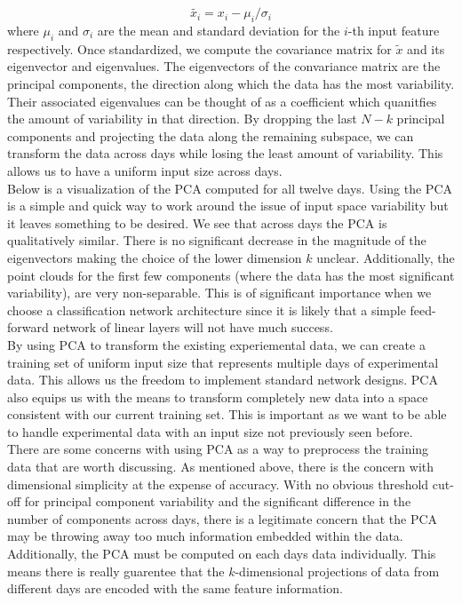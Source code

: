 \documentclass[12pt]{article}
\begin{document}
$$ \tilde{x_i} = x_i - \mu_i / \sigma_i $$
where $\mu_i$ and $\sigma_i$ are the mean and standard deviation for the $i$-th input feature respectively. Once standardized, we compute the covariance matrix for $\tilde{x}$ and its eigenvector and eigenvalues. The eigenvectors of the convariance matrix are the principal components, the direction along which the data has the most variability. Their associated eigenvalues can be thought of as a coefficient which quanitfies the amount of variability in that direction. By dropping the last $N-k$ principal components and projecting the data along the remaining subspace, we can transform the data across days while losing the least amount of variability. This allows us to have a uniform input size across days. \\
Below is a visualization of the PCA computed for all twelve days. Using the PCA is a simple and quick way to work around the issue of input space variability but it leaves something to be desired. We see that across days the PCA is qualitatively similar. There is no significant decrease in the magnitude of the eigenvectors making the choice of the lower dimension $k$ unclear. Additionally, the point clouds for the first few components (where the data has the most significant variability), are very non-separable. This is of significant importance when we choose a classification network architecture since it is likely that a simple feed-forward network of linear layers will not have much success. \\
By using PCA to transform the existing experiemental data, we can create a training set of uniform input size that represents multiple days of experimental data. This allows us the freedom to implement standard network designs. PCA also equips us with the means to transform completely new data into a space consistent with our current training set. This is important as we want to be able to handle experimental data with an input size not previously seen before. \\
\indent There are some concerns with using PCA as a way to preprocess the training data that are worth discussing. As mentioned above, there is the concern with  dimensional simplicity at the expense of accuracy. With no obvious threshold cut-off for principal component variability and the significant difference in the number of components across days, there is a legitimate concern that the PCA may be throwing away too much information embedded within the data. Additionally, the PCA must be computed on each days data individually. This means there is really guarentee that the $k$-dimensional projections of data from different days are encoded with the same feature information.\\
\end{document}
